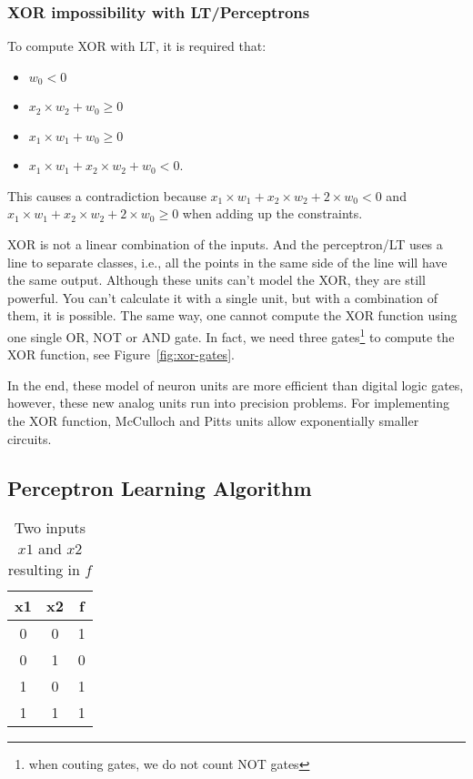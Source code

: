 \documentclass[main]{subfiles}
\begin{document}
\subsubsection{XOR impossibility with LT/Perceptrons}
To compute XOR with LT, it is required that:

\begin{itemize}[noitemsep,nolistsep]
	\item $w_0 < 0$
	\item $x_2 \times w_2 + w_0 \geq 0$
	\item $x_1 \times w_1 + w_0 \geq 0$
	\item $x_1 \times w_1 + x_2 \times w_2 + w_0 < 0$.
\end{itemize}

This causes a contradiction because $x_1 \times w_1 + x_2 \times w_2 + 2 \times w_0 < 0$ and $x_1 \times w_1 + x_2 \times w_2 + 2 \times w_0 \geq 0$ when adding up the constraints.

XOR is not a linear combination of the inputs.
And the perceptron/LT uses a line to separate classes, i.e., all the points in the same side of the line will have the same output.
Although these units can't model the XOR, they are still powerful.
You can't calculate it with a single unit, but with a combination of them, it is possible.
The same way, one cannot compute the XOR function using one single OR, NOT or AND gate.
In fact, we need three gates\footnote{when couting gates, we do not count NOT gates} to compute the XOR function, see Figure~\ref{fig:xor-gates}.

In the end, these model of neuron units are more efficient than digital logic gates, however, these new analog units run into precision problems.
For implementing the XOR function, McCulloch and Pitts units allow exponentially smaller circuits.

\subsection{Perceptron Learning Algorithm}

\begin{table}[H]
\centering
\begin{tabular}{cc|c}
x1 & x2 & f \\ 
\hline
0  & 0  & 1 \\
0  & 1  & 0 \\
1  & 0  & 1 \\
1  & 1  & 1 \\ 
\end{tabular}
\caption{Two inputs $x1$ and $x2$ resulting in $f$}
\label{tab:simple_function}
\end{table}
\end{document}
